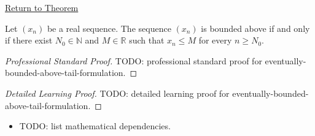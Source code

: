\newpage
{}
\label{prf:eventually-bounded-above-tail-formulation}

\begin{remark*}[Return]
\hyperref[thm:eventually-bounded-above-tail-formulation]{Return to Theorem}
\end{remark*}

\begin{theorem*}
Let $(x_n)$ be a real sequence. The sequence $(x_n)$ is bounded above if and
only if there exist $N_0 \in \mathbb{N}$ and $M \in \mathbb{R}$ such that
$x_n \le M$ for every $n \ge N_0$.

\smallskip
\noindent
\end{theorem*}

\begin{proof}[Professional Standard Proof]
\LRAProofBodyStart
TODO: professional standard proof for eventually-bounded-above-tail-formulation.
\end{proof}

\begin{proof}[Detailed Learning Proof]
\LRAProofBodyStart
TODO: detailed learning proof for eventually-bounded-above-tail-formulation.
\end{proof}

\begin{remark*}
\end{remark*}

\begin{dependencies}
\begin{itemize}
  \item TODO: list mathematical dependencies.
\end{itemize}
\end{dependencies}

\clearpage
